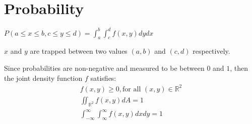 \documentclass[12pt]{article}
\begin{document}
\section{Probability}
\(P(a \leq x \leq b, c \leq y \leq d) = \int_{a}^{b} \int_{c}^{d} f(x,y)dydx\)

\(x\) and \(y\) are trapped between two values \((a,b)\) and \((c,d)\) respectively.

Since probabilities are non-negative and measured to be between \(0\) and \(1\), then the joint density function \(f\) satisfies:
\begin{align*}
	f(x,y) \geq 0, \text{for all } (x,y) \in \mathbb{R}^2 \\
	\iint_{\mathbb{R}^2}f(x,y)dA = 1 \\
	\int_{-\infty}^{\infty} \int_{\infty}^{\infty} f(x,y)dxdy = 1
\end{align*}
\end{document}
